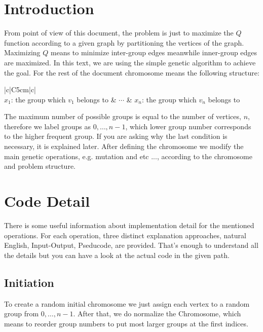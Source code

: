 \documentclass{article}
\begin{document}
\section*{Introduction}
From point of view of this document, the problem is just to maximize the $Q$ function according to a given graph by partitioning the vertices of the graph. Maximizing $Q$ means to minimize inter-group edges meanwhile inner-group edges are maximized. In this text, we are using the simple genetic algorithm to achieve the goal. For the rest of the document chromosome means the following structure:

\begin{center}
\begin{table}[h]
\begin{tabular}{|c|C{5cm}|c|}
\hline
{} \\\hline
$x_1$: the group which $v_1$ belongs to & $\cdots$ & $x_n$: the group which $v_n$ belongs to\\\hline
\end{tabular}
\end{table}
\end{center}

The maximum number of possible groups is equal to the number of vertices, $n$, therefore we label groups as $0, \dots, n - 1$, which lower group number corresponds to the higher frequent group. If you are asking why the last condition is necessary, it is explained later. After defining the chromosome we modify the main genetic operations, e.g. mutation and etc ..., according to the chromosome and problem structure.

\section*{Code Detail}
There is some useful information about implementation detail for the mentioned operations.
For each operation, three distinct explanation approaches, natural English, Input-Output, Pseducode, are provided. That's enough to understand all the details but you can have a look at the actual code in the given path. 

\subsection*{Initiation}
To create a random initial chromosome we just assign each vertex to a random group from $0, \dots, n - 1$. After that, we do normalize the Chromosome, which means to reorder group numbers to put most larger groups at the first indices.
\end{document}
